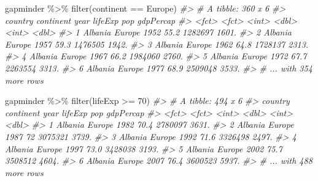 \documentclass[
]{book}
\newenvironment{Shaded}{\begin{snugshade}}{\end{snugshade}}
\newcommand{\CommentTok}[1]{\textcolor[rgb]{0.56,0.35,0.01}{\textit{#1}}}
\newcommand{\DecValTok}[1]{\textcolor[rgb]{0.00,0.00,0.81}{#1}}
\newcommand{\FunctionTok}[1]{\textcolor[rgb]{0.00,0.00,0.00}{#1}}
\newcommand{\NormalTok}[1]{#1}
\newcommand{\SpecialCharTok}[1]{\textcolor[rgb]{0.00,0.00,0.00}{#1}}
\newcommand{\StringTok}[1]{\textcolor[rgb]{0.31,0.60,0.02}{#1}}
\begin{document}
\begin{Shaded}
\begin{Highlighting}[]
\NormalTok{gapminder }\SpecialCharTok{\%\textgreater{}\%} \FunctionTok{filter}\NormalTok{(continent }\SpecialCharTok{==} \StringTok{\textquotesingle{}Europe\textquotesingle{}}\NormalTok{)}
\CommentTok{\#\textgreater{} \# A tibble: 360 x 6}
\CommentTok{\#\textgreater{}   country continent  year lifeExp     pop gdpPercap}
\CommentTok{\#\textgreater{}   \textless{}fct\textgreater{}   \textless{}fct\textgreater{}     \textless{}int\textgreater{}   \textless{}dbl\textgreater{}   \textless{}int\textgreater{}     \textless{}dbl\textgreater{}}
\CommentTok{\#\textgreater{} 1 Albania Europe     1952    55.2 1282697     1601.}
\CommentTok{\#\textgreater{} 2 Albania Europe     1957    59.3 1476505     1942.}
\CommentTok{\#\textgreater{} 3 Albania Europe     1962    64.8 1728137     2313.}
\CommentTok{\#\textgreater{} 4 Albania Europe     1967    66.2 1984060     2760.}
\CommentTok{\#\textgreater{} 5 Albania Europe     1972    67.7 2263554     3313.}
\CommentTok{\#\textgreater{} 6 Albania Europe     1977    68.9 2509048     3533.}
\CommentTok{\#\textgreater{} \# ... with 354 more rows}
\end{Highlighting}
\end{Shaded}

\begin{Shaded}
\begin{Highlighting}[]
\NormalTok{gapminder }\SpecialCharTok{\%\textgreater{}\%} \FunctionTok{filter}\NormalTok{(lifeExp }\SpecialCharTok{\textgreater{}=} \DecValTok{70}\NormalTok{)}
\CommentTok{\#\textgreater{} \# A tibble: 494 x 6}
\CommentTok{\#\textgreater{}   country continent  year lifeExp     pop gdpPercap}
\CommentTok{\#\textgreater{}   \textless{}fct\textgreater{}   \textless{}fct\textgreater{}     \textless{}int\textgreater{}   \textless{}dbl\textgreater{}   \textless{}int\textgreater{}     \textless{}dbl\textgreater{}}
\CommentTok{\#\textgreater{} 1 Albania Europe     1982    70.4 2780097     3631.}
\CommentTok{\#\textgreater{} 2 Albania Europe     1987    72   3075321     3739.}
\CommentTok{\#\textgreater{} 3 Albania Europe     1992    71.6 3326498     2497.}
\CommentTok{\#\textgreater{} 4 Albania Europe     1997    73.0 3428038     3193.}
\CommentTok{\#\textgreater{} 5 Albania Europe     2002    75.7 3508512     4604.}
\CommentTok{\#\textgreater{} 6 Albania Europe     2007    76.4 3600523     5937.}
\CommentTok{\#\textgreater{} \# ... with 488 more rows}
\end{Highlighting}
\end{Shaded}
\end{document}
